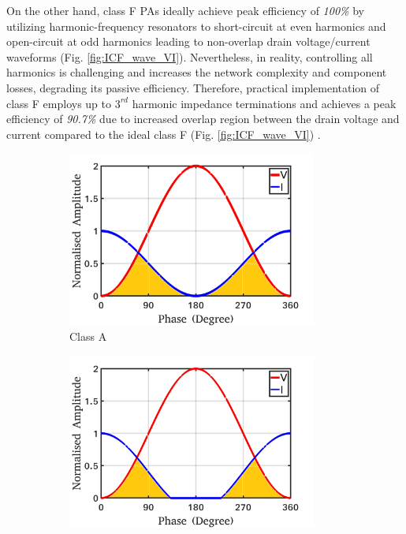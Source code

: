 \documentclass[conference]{IEEEtran}
\begin{document}
On the other hand, class F PAs ideally achieve peak efficiency of \textit{100\%} by utilizing harmonic-frequency resonators to short-circuit at even harmonics and open-circuit at odd harmonics leading to non-overlap drain voltage/current waveforms (Fig. \ref{fig:ICF_wave_VI}). Nevertheless, in reality, controlling all harmonics is challenging and increases the network complexity and component losses, degrading its passive efficiency. Therefore, practical implementation of class F employs up to $3^{rd}$ harmonic impedance terminations and achieves a peak efficiency of \textit{90.7\%} due to increased overlap region between the drain voltage and current compared to the ideal class F (Fig. \ref{fig:ICF_wave_VI}) \cite{Raab_max_eff}.
\begin{figure}[!t]
\centering
\captionsetup{font=footnotesize}
\begin{subfigure}{0.24\textwidth}
\includegraphics[width=0.9\textwidth]{Images/Intro/ClassA_shaded.jpg}
\caption{Class A}
\label{fig:CA_wave_VI}
\end{subfigure}
\begin{subfigure}{0.24\textwidth}
\includegraphics[width=0.9\textwidth]{Images/Intro/ClassB_shaded.jpg}

\end{subfigure}
\end{figure}
\end{document}
